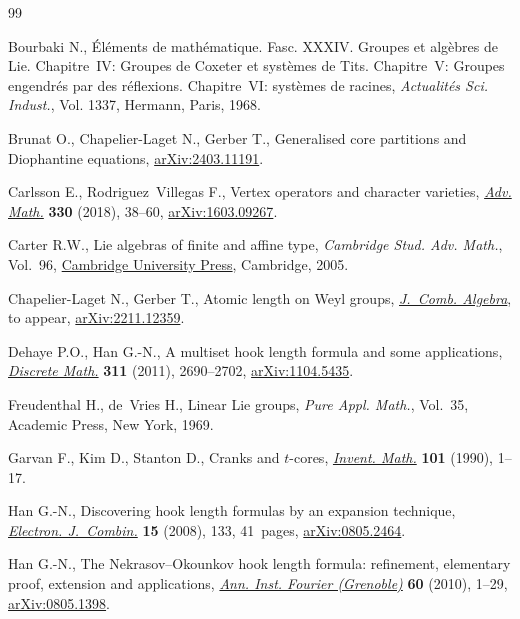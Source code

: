 \documentclass[10pt,a4paper]{amsart}
\numberwithin{equation}{section}
\begin{document}
\begin{thebibliography}{99}
\footnotesize\itemsep=0pt

Bourbaki N., \'El\'ements de math\'ematique. {F}asc. {XXXIV}. {G}roupes et
 alg\`ebres de {L}ie. {C}hapitre~{IV}: {G}roupes de {C}oxeter et syst\`emes de
 {T}its. {C}hapitre~{V}: {G}roupes engendr\'es par des r\'eflexions.
 {C}hapitre~{VI}: syst\`emes de racines, \textit{Actualit\'es Sci. Indust.},
 Vol. 1337, Hermann, Paris, 1968.

Brunat O., Chapelier-Laget N., Gerber T., Generalised core partitions and
 {D}iophantine equations, \href{https://arxiv.org/abs/2403.11191}{arXiv:2403.11191}.

Carlsson E., Rodriguez~Villegas F., Vertex operators and character varieties,
 \href{https://doi.org/10.1016/j.aim.2017.12.024}{\textit{Adv. Math.}} \textbf{330} (2018), 38--60, \href{https://arxiv.org/abs/1603.09267}{arXiv:1603.09267}.

Carter R.W., Lie algebras of finite and affine type, \textit{Cambridge Stud.
 Adv. Math.}, Vol.~96, \href{https://doi.org/10.1017/CBO9780511614910}{Cambridge University Press}, Cambridge, 2005.

Chapelier-Laget N., Gerber T., Atomic length on {W}eyl groups, \href{https://doi.org/10.4171/JCA/104}{\textit{J.~Comb.
 Algebra}}, {t}o appear, \href{https://arxiv.org/abs/2211.12359}{arXiv:2211.12359}.

Dehaye P.O., Han G.-N., A multiset hook length formula and some applications,
 \href{https://doi.org/10.1016/j.disc.2011.08.018}{\textit{Discrete Math.}} \textbf{311} (2011), 2690--2702, \href{https://arxiv.org/abs/1104.5435}{arXiv:1104.5435}.

Freudenthal H., de~Vries H., Linear {L}ie groups, \textit{Pure Appl. Math.},
 Vol.~35, Academic Press, New York, 1969.

Garvan F., Kim D., Stanton D., Cranks and {$t$}-cores, \href{https://doi.org/10.1007/BF01231493}{\textit{Invent. Math.}}
 \textbf{101} (1990), 1--17.

Han G.-N., Discovering hook length formulas by an expansion technique,
 \href{https://doi.org/10.37236/857}{\textit{Electron. J.~Combin.}} \textbf{15} (2008), 133, 41~pages,
 \href{https://arxiv.org/abs/0805.2464}{arXiv:0805.2464}.

Han G.-N., The {N}ekrasov--{O}kounkov hook length formula: refinement,
 elementary proof, extension and applications, \href{https://doi.org/10.5802/aif.2515}{\textit{Ann. Inst. Fourier
 (Grenoble)}} \textbf{60} (2010), 1--29, \href{https://arxiv.org/abs/0805.1398}{arXiv:0805.1398}.


\end{thebibliography}
\end{document}
